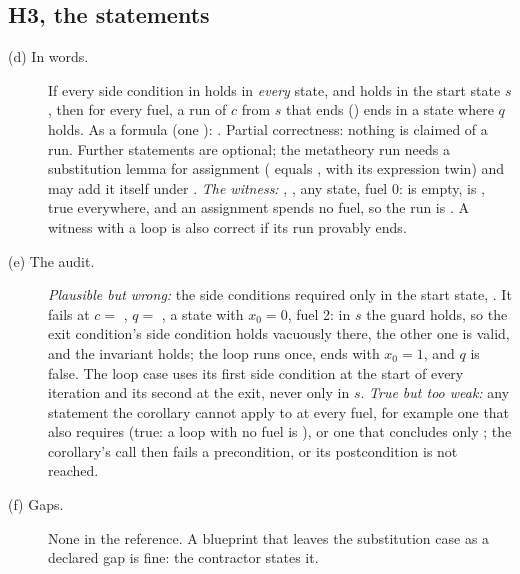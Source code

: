 \documentclass[11pt]{article}
\begin{document}
\subsection*{H3, the statements}
\begin{description}
\item[(d) In words.] If every side condition in  holds in
  \emph{every} state, and  holds in the start state $s$, then
  for every fuel, a run of $c$ from $s$ that ends () ends in a state
  where $q$ holds. As a formula (one ):
  .
  Partial correctness: nothing is claimed of a  run. Further
  statements are optional; the metatheory run needs a substitution lemma for
  assignment ( equals
  , with its expression twin) and
  may add it itself under .
  \emph{The witness:} ,
  , any state, fuel 0:  is
  empty,  is , true everywhere,
  and an assignment spends no fuel, so the run is . A witness with
  a loop is also correct if its run provably ends.
\item[(e) The audit.] \emph{Plausible but wrong:} the side conditions
  required only in the start state, . It fails at
  $c = $ , $q = $ , a state with
  $x_0 = 0$, fuel 2: in $s$ the guard holds, so the exit condition's side
  condition holds vacuously there, the other one is valid, and the
  invariant holds; the loop runs once, ends  with $x_0 = 1$, and
  $q$ is false. The loop case uses its first side condition at the start of
  every iteration and its second at the exit, never only in $s$.
  \emph{True but too weak:} any statement the corollary cannot apply to
   at every fuel, for example one that also requires
   (true: a loop with no fuel is ), or one that
  concludes only ; the corollary's call then fails a
  precondition, or its postcondition is not reached.
\item[(f) Gaps.] None in the reference. A blueprint that leaves the
  substitution case as a declared gap is fine: the contractor states it.
\end{description}
\end{document}
